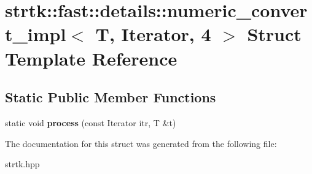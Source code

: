 \hypertarget{structstrtk_1_1fast_1_1details_1_1numeric__convert__impl_3_01T_00_01Iterator_00_014_01_4}{\section{strtk\-:\-:fast\-:\-:details\-:\-:numeric\-\_\-convert\-\_\-impl$<$ T, Iterator, 4 $>$ Struct Template Reference}
\label{structstrtk_1_1fast_1_1details_1_1numeric__convert__impl_3_01T_00_01Iterator_00_014_01_4}
}
\subsection*{Static Public Member Functions}
\begin{DoxyCompactItemize}
\item 
\hypertarget{structstrtk_1_1fast_1_1details_1_1numeric__convert__impl_3_01T_00_01Iterator_00_014_01_4_a4ca73d105fa3c87bbf9f58d4f2682b4b}{static void {\bfseries process} (const Iterator itr, T \&t)}\label{structstrtk_1_1fast_1_1details_1_1numeric__convert__impl_3_01T_00_01Iterator_00_014_01_4_a4ca73d105fa3c87bbf9f58d4f2682b4b}

\end{DoxyCompactItemize}


The documentation for this struct was generated from the following file\-:\begin{DoxyCompactItemize}
\item 
strtk.\-hpp\end{DoxyCompactItemize}
